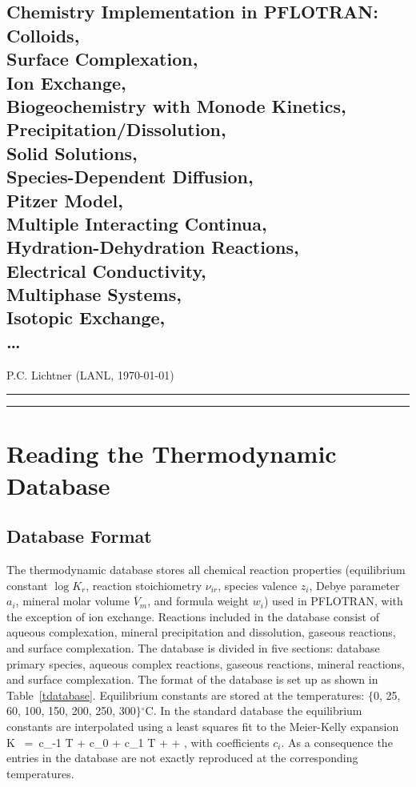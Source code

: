 \documentclass[12pt]{article}
\def\EQ#1\EN{\begin{equation}#1\end{equation}}
\newcommand{\bcr}{\begin{center}}
\newcommand{\ecr}{\end{center}}
\newcommand{\eq}{\ =\ }
\newcommand{\degc}{$^\circ$C}
\newcommand{\longline}{\noindent\rule[-0.1in]{\textwidth}{0.01in}}
\begin{document}
\bcr

\section*{Chemistry Implementation in PFLOTRAN: \\
Colloids,\\ 
Surface Complexation, \\
Ion Exchange, \\
Biogeochemistry with Monode Kinetics, \\
Precipitation/Dissolution, \\
Solid Solutions, \\
Species-Dependent Diffusion, \\
Pitzer Model, \\
Multiple Interacting Continua, \\
Hydration-Dehydration Reactions, \\
Electrical Conductivity, \\
Multiphase Systems, \\
Isotopic Exchange, \\
\ldots}

P.C. Lichtner (LANL, \today)

\ecr

\longline

\tableofcontents

\longline

\section{Reading the Thermodynamic Database}

\setcounter{equation}{0}

\subsection{Database Format}

The thermodynamic database stores all chemical reaction properties (equilibrium constant $\log K_r$, reaction stoichiometry $\nu_{ir}$, species valence $z_i$, Debye parameter $a_i$, mineral molar volume $\overline V_m$, and formula weight $w_i$) used in PFLOTRAN, with the exception of ion exchange. Reactions included in the database consist of aqueous complexation, mineral precipitation and dissolution, gaseous reactions, and surface complexation. The database is divided in five sections: database primary species, aqueous complex reactions, gaseous reactions, mineral reactions, and surface complexation. The format of the database is set up as shown in Table~\ref{tdatabase}. Equilibrium constants are stored at the temperatures: $\{$0, 25, 60, 100, 150, 200, 250, 300$\}$\degc. In the standard database the equilibrium constants are interpolated using a least squares fit to the Meier-Kelly expansion
\EQ
\log K \eq c_{-1} \ln T + c_0 + c_1 T +  + ,
\EN
with coefficients $c_i$. As a consequence the entries in the database are not exactly reproduced at the corresponding temperatures. 
\end{document}
